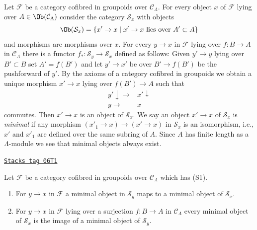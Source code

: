 \medskip\noindent
Let $\mathcal{F}$ be a category cofibred in groupoids over
$\mathcal{C}_\Lambda$. For every object $x$ of $\mathcal{F}$
lying over $A \in \Ob(\mathcal{C}_\Lambda)$ consider the
category $\mathcal{S}_x$ with objects
$$
\Ob(\mathcal{S}_x) =
\{x' \to x \mid x' \to x\text{ lies over }A' \subset A\}
$$
and morphisms are morphisms over $x$. For every $y \to x$ in
$\mathcal{F}$ lying over $f : B \to A$
in $\mathcal{C}_\Lambda$ there is a functor
$f_* : \mathcal{S}_y \to \mathcal{S}_x$ defined as follows:
Given $y' \to y$ lying over $B' \subset B$ set $A' = f(B')$
and let $y' \to x'$ be over $B' \to f(B')$ be the pushforward of $y'$.
By the axioms of a category cofibred in groupoids we obtain a
unique morphism $x' \to x$ lying over $f(B') \to A$ such that
$$
\begin{array}{cc}y' \downarrow\longrightarrow & x' \downarrow \\ y \longrightarrow & x\end{array}
$$
commutes. Then $x' \to x$ is an object of $\mathcal{S}_x$. We say an
object $x' \to x$ of $\mathcal{S}_x$ is {\it minimal} if any morphism
$(x'_1 \to x) \to (x' \to x)$ in $\mathcal{S}_x$ is an isomorphism, i.e.,
$x'$ and $x'_1$ are defined over the same subring of $A$. Since
$A$ has finite length as a $\Lambda$-module we see that minimal objects
always exist.

\begin{lemma}
\label{formal-defos-lemma-smallest-where-descends}
\href{https://stacks.math.columbia.edu/tag/06T1}{\texttt{Stacks tag 06T1}}

Let $\mathcal{F}$ be a category cofibred in groupoids over
$\mathcal{C}_\Lambda$ which has (S1).
\begin{enumerate}
\item For $y \to x$ in $\mathcal{F}$ a minimal
object in $\mathcal{S}_y$ maps to a minimal object of $\mathcal{S}_x$.
\item For $y \to x$ in $\mathcal{F}$ lying over a surjection
$f : B \to A$ in $\mathcal{C}_\Lambda$ every minimal object
of $\mathcal{S}_x$ is the image of a minimal object of
$\mathcal{S}_y$.
\end{enumerate}
\end{lemma}

